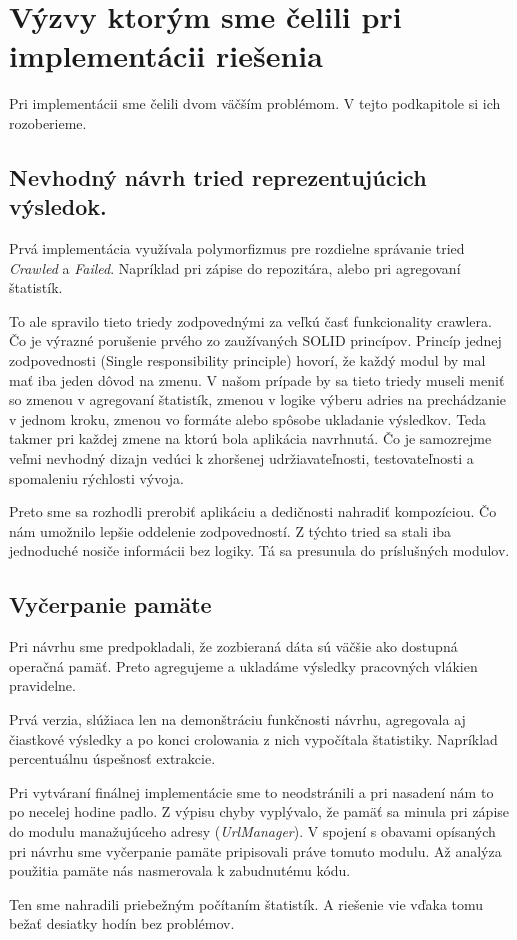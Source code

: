 \section{Výzvy ktorým sme čelili pri implementácii riešenia}
Pri implementácii sme čelili dvom väčším problémom. V tejto podkapitole si ich rozoberieme.

\subsection{Nevhodný návrh tried reprezentujúcich výsledok.}
Prvá implementácia využívala polymorfizmus pre rozdielne správanie tried \textit{Crawled} a \textit{Failed}. Napríklad pri zápise do repozitára, alebo pri agregovaní štatistík. 

To ale spravilo tieto triedy zodpovednými za veľkú časť funkcionality crawlera. Čo je výrazné porušenie prvého zo zaužívaných SOLID princípov. Princíp jednej zodpovednosti (Single responsibility principle) hovorí, že každý modul by mal mať iba jeden dôvod na zmenu. V našom prípade by sa tieto triedy museli meniť so zmenou v agregovaní štatistík, zmenou v logike výberu adries na prechádzanie v jednom kroku, zmenou vo formáte alebo spôsobe ukladanie výsledkov. Teda takmer pri každej zmene na ktorú bola aplikácia navrhnutá. Čo je samozrejme veľmi nevhodný dizajn vedúci k zhoršenej udržiavateľnosti, testovateľnosti a spomaleniu rýchlosti vývoja.  

Preto sme sa rozhodli prerobiť aplikáciu a dedičnosti nahradiť kompozíciou. Čo nám umožnilo lepšie oddelenie zodpovedností. Z týchto tried sa stali iba jednoduché nosiče informácii bez logiky. Tá sa presunula do príslušných modulov.

\subsection{Vyčerpanie pamäte}
Pri návrhu sme predpokladali, že zozbieraná dáta sú väčšie ako dostupná operačná pamäť. Preto agregujeme a ukladáme výsledky pracovných vlákien pravidelne. 

Prvá verzia, slúžiaca len na demonštráciu funkčnosti návrhu, agregovala aj čiastkové výsledky a po konci crolowania z nich vypočítala štatistiky. Napríklad percentuálnu úspešnosť extrakcie. 

Pri vytváraní finálnej implementácie sme to neodstránili a pri nasadení nám to po necelej hodine padlo. Z výpisu chyby vyplývalo, že pamäť sa minula pri zápise do modulu manažujúceho adresy (\textit{UrlManager}). V spojení s obavami opísaných pri návrhu sme vyčerpanie pamäte pripisovali práve tomuto modulu. Až analýza použitia pamäte nás nasmerovala k zabudnutému kódu. 

Ten sme nahradili priebežným počítaním štatistík. A riešenie vie vďaka tomu bežať desiatky hodín bez problémov.